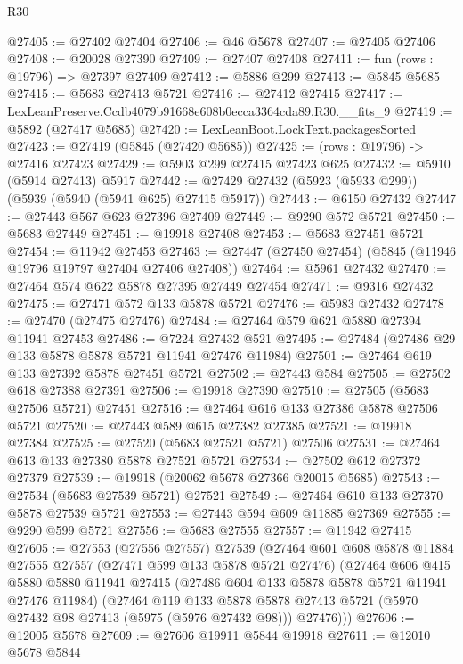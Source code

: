 \begin{lexlean}{R30}
\begin{coremodule}
@27405 := @27402 @27404
@27406 := @46 @5678
@27407 := @27405 @27406
@27408 := @20028 @27390
@27409 := @27407 @27408
@27411 := fun (rows : @19796) => @27397 @27409
@27412 := @5886 @299
@27413 := @5845 @5685
@27415 := @5683 @27413 @5721
@27416 := @27412 @27415
@27417 := LexLeanPreserve.Ccdb4079b91668e608b0ecca3364cda89.R30.__fits_9
@27419 := @5892 (@27417 @5685)
@27420 := LexLeanBoot.LockText.packagesSorted
@27423 := @27419 (@5845 (@27420 @5685))
@27425 := (rows : @19796) -> @27416 @27423
@27429 := @5903 @299 @27415 @27423 @625
@27432 := @5910 (@5914 @27413) @5917
@27442 := @27429 @27432 (@5923 (@5933 @299)) (@5939 (@5940 (@5941 @625) @27415 @5917))
@27443 := @6150 @27432
@27447 := @27443 @567 @623 @27396 @27409
@27449 := @9290 @572 @5721
@27450 := @5683 @27449
@27451 := @19918 @27408
@27453 := @5683 @27451 @5721
@27454 := @11942 @27453
@27463 := @27447 (@27450 @27454) (@5845 (@11946 @19796 @19797 @27404 @27406 @27408))
@27464 := @5961 @27432
@27470 := @27464 @574 @622 @5878 @27395 @27449 @27454
@27471 := @9316 @27432
@27475 := @27471 @572 @133 @5878 @5721
@27476 := @5983 @27432
@27478 := @27470 (@27475 @27476)
@27484 := @27464 @579 @621 @5880 @27394 @11941 @27453
@27486 := @7224 @27432 @521
@27495 := @27484 (@27486 @29 @133 @5878 @5878 @5721 @11941 @27476 @11984)
@27501 := @27464 @619 @133 @27392 @5878 @27451 @5721
@27502 := @27443 @584
@27505 := @27502 @618 @27388 @27391
@27506 := @19918 @27390
@27510 := @27505 (@5683 @27506 @5721) @27451
@27516 := @27464 @616 @133 @27386 @5878 @27506 @5721
@27520 := @27443 @589 @615 @27382 @27385
@27521 := @19918 @27384
@27525 := @27520 (@5683 @27521 @5721) @27506
@27531 := @27464 @613 @133 @27380 @5878 @27521 @5721
@27534 := @27502 @612 @27372 @27379
@27539 := @19918 (@20062 @5678 @27366 @20015 @5685)
@27543 := @27534 (@5683 @27539 @5721) @27521
@27549 := @27464 @610 @133 @27370 @5878 @27539 @5721
@27553 := @27443 @594 @609 @11885 @27369
@27555 := @9290 @599 @5721
@27556 := @5683 @27555
@27557 := @11942 @27415
@27605 := @27553
    (@27556 @27557)
    @27539
    (@27464
      @601
      @608
      @5878
      @11884
      @27555
      @27557
      (@27471 @599 @133 @5878 @5721 @27476)
      (@27464
        @606
        @415
        @5880
        @5880
        @11941
        @27415
        (@27486 @604 @133 @5878 @5878 @5721 @11941 @27476 @11984)
        (@27464
          @119
          @133
          @5878
          @5878
          @27413
          @5721
          (@5970 @27432 @98 @27413 (@5975 (@5976 @27432 @98)))
          @27476)))
@27606 := @12005 @5678
@27609 := @27606 @19911 @5844 @19918
@27611 := @12010 @5678 @5844

\end{coremodule}
\end{lexlean}
